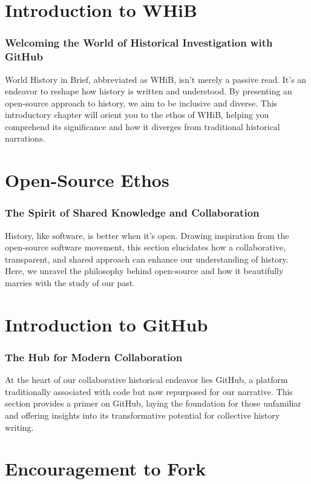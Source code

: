 \documentclass[a4paper,12pt]{book}
\begin{document}
\chapter{Introduction to WHiB}
\subsection*{Welcoming the World of Historical Investigation with GitHub}
World History in Brief, abbreviated as WHiB, isn't merely a passive read. It's an endeavor to reshape how history is written and understood. By presenting an open-source approach to history, we aim to be inclusive and diverse. This introductory chapter will orient you to the ethos of WHiB, helping you comprehend its significance and how it diverges from traditional historical narrations.


\chapter{Open-Source Ethos}
\subsection*{The Spirit of Shared Knowledge and Collaboration}
History, like software, is better when it's open. Drawing inspiration from the open-source software movement, this section elucidates how a collaborative, transparent, and shared approach can enhance our understanding of history. Here, we unravel the philosophy behind open-source and how it beautifully marries with the study of our past.

\chapter{Introduction to GitHub}
\subsection*{The Hub for Modern Collaboration}
At the heart of our collaborative historical endeavor lies GitHub, a platform traditionally associated with code but now repurposed for our narrative. This section provides a primer on GitHub, laying the foundation for those unfamiliar and offering insights into its transformative potential for collective history writing.

\chapter{Encouragement to Fork}
\end{document}
